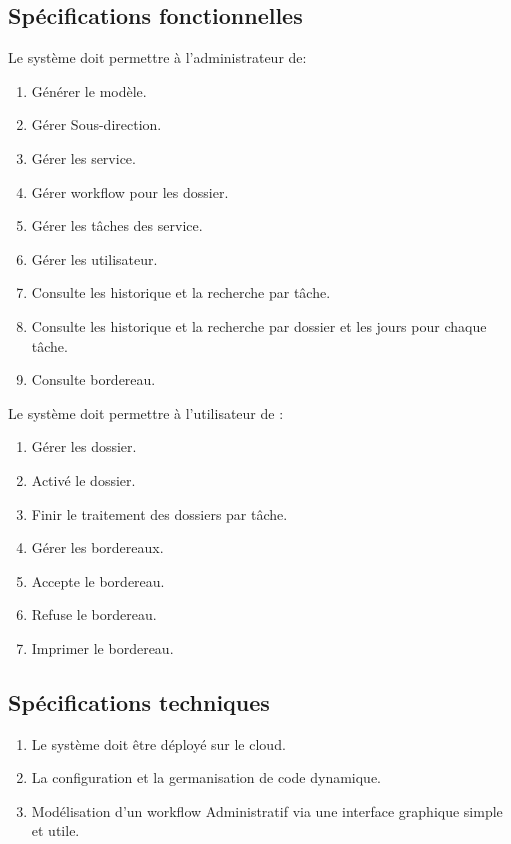  \subsection{Spécifications fonctionnelles }
  Le système doit permettre à l’administrateur  de:
 \begin{enumerate}
\item  	    Générer le modèle. 
\item  	    Gérer Sous-direction. 
\item  	    Gérer les service.
\item  	    Gérer workflow pour les dossier.  
\item  	    Gérer les tâches des service.  
\item  	    Gérer les utilisateur. 
\item  	    Consulte les historique  et la recherche par tâche. 
\item  	    Consulte les historique  et la recherche par dossier et les jours pour chaque tâche. 
\item  	    Consulte bordereau. 
 \end{enumerate}
 Le système doit permettre à l’utilisateur   de :
 \begin{enumerate}
\item  	    Gérer les dossier. 
\item  	    Activé le dossier.    
\item  	    Finir le traitement des dossiers par tâche.    
\item  	    Gérer les  bordereaux.  
\item  	    Accepte le  bordereau.  
\item  	    Refuse  le  bordereau.  
\item  	    Imprimer le  bordereau.  

 \end{enumerate}
 
 
 
 
  \subsection{Spécifications techniques }
 
 
 
  \begin{enumerate}
 	\item  	   Le système doit être déployé sur le cloud.  
 	\item  	   La configuration et la germanisation de code dynamique.  
 	\item  	  Modélisation d'un workflow Administratif via une interface graphique simple et utile. 
 
 	
 \end{enumerate}
 
